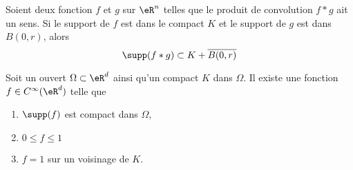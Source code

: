 \begin{proposition}		\label{PROPooQWNNooHmHRbk}
	Soient deux fonction \( f\) et \( g\) sur \( \eR^n\) telles que le produit de convolution \( f*g\) ait un sens. Si le support de \( f\) est dans le compact \( K\) et le support de \( g\) est dans \( B(0,r)\), alors
	\begin{equation}
		\supp(f*g)\subset K+\overline{B(0,r)}
	\end{equation}
\end{proposition}

\begin{proposition}       \label{PROPooBOZIooAhKbPs}
	Soit un ouvert \( \Omega\subset \eR^d\) ainsi qu'un compact \( K\) dans \( \Omega\). Il existe une fonction \( f\in C^{\infty}(\eR^d)\) telle que
	\begin{enumerate}
		\item
		      \( \supp(f)\) est compact dans \( \Omega\),
		\item
		      \( 0\leq f\leq 1\)
		\item
		      \( f=1\) sur un voisinage de \( K\).
	\end{enumerate}
\end{proposition}

